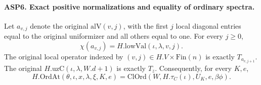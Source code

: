 \documentclass[11pt,a4paper]{article}
\numberwithin{equation}{section}
\theoremstyle{remark}\newtheorem{remark}[theorem]{Remark}
\begin{document}
\paragraph{ASP6. Exact positive normalizations and equality of ordinary spectra.}
\label{claim:ASP6}
Let $a_{v,\allowbreak{} j}$ denote the original $\mathrm{alV}(v,\allowbreak{} j)$,
with the first $j$ local diagonal entries equal to
the original uniformizer and all others equal to
one.  For every $j\geq0$,
\begin{equation}\label{eq:asp-lowval}
                  \chi(a_{v,\allowbreak{} j})=H.\mathrm{lowVal}(\iota,\lambda,\allowbreak{} v,\allowbreak{} j).
\end{equation}
The original local operator indexed by
$(v,\allowbreak{} j)\in H.V\times\mathrm{Fin}(n)$ is exactly
$T_{a_{v,\allowbreak{} j+1}}$.  The original
$H.\mathrm{uzC}(\iota,\lambda,\allowbreak{} W.d+1)$ is exactly $T_z$.
Consequently, for every $K,\allowbreak{} e$,
\begin{equation}\label{eq:asp-ordinary}
 H.\mathrm{OrdAt}(\theta,\iota,\allowbreak{} x,\lambda,\xi,\allowbreak{} K,\allowbreak{} e)
  =\mathrm{ClOrd}(W,\allowbreak{} H.\tau_C(\iota),\allowbreak{} U_K,\allowbreak{} e,\beta\phi).
\end{equation}
\end{document}
